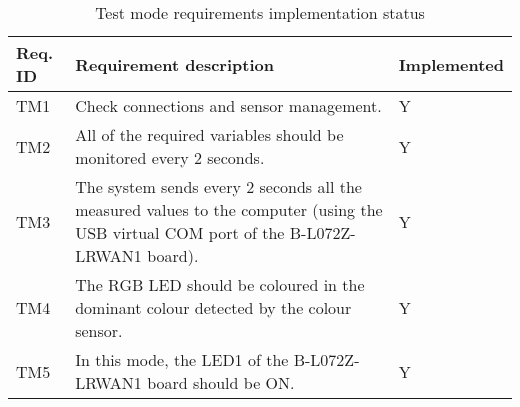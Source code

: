 \vspace{2\baselineskip}

\begin{table}[H]
    \begin{center}
        \begin{tabular}{p{} | p{} | p{}}
            Req. ID & Requirement description & Implemented\\
            \hline
            TM1 & Check connections and sensor management. & Y\\
            \hline
            TM2 & All of the required variables should be monitored every 2 seconds. & Y\\
            \hline
            TM3 & The system sends every 2 seconds all the measured values to the computer (using the USB virtual COM port of the B-L072Z-LRWAN1 board). & Y\\
            \hline
            TM4 & The RGB LED should be coloured in the dominant colour detected by the colour sensor. & Y\\
            \hline
            TM5 & In this mode, the LED1 of the B-L072Z-LRWAN1 board should be ON. & Y\\
            \hline
        \end{tabular} 
    \end{center}
    \caption{Test mode requirements implementation status}
    \label{ReqTest}
\end{table}

